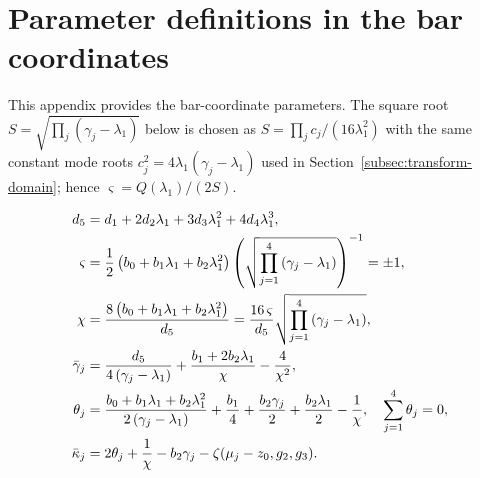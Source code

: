 \documentclass[11pt,a4paper]{article}
\numberwithin{equation}{section}
\begin{document}

\section{Parameter definitions in the bar coordinates}
\label{app:bar-coords-params}

This appendix provides the bar-coordinate parameters.
The square root $S=\sqrt{\prod_j(\gamma_j-\lambda_1)}$ below is chosen as $S=\prod_j c_j/(16\lambda_1^2)$ with the same constant mode roots $c_j^2=4\lambda_1(\gamma_j-\lambda_1)$ used in Section~\ref{subsec:transform-domain}; hence $\varsigma=Q(\lambda_1)/(2S)$.

\begin{align}
{d}_{5} &= {d}_{1} + 2 {d}_{2} {\lambda}_{1} + 3 {d}_{3} {\lambda}_{1}^{2} + 4 {d}_{4} {\lambda}_{1}^{3}, \notag  \\
\varsigma & = \frac{1}{2} \left(b_0 + b_1 {\lambda}_{1} + b_2{\lambda}_{1}^2\right) \left(\sqrt{\prod\limits_{j=1}^4 \left(\gamma_j - \lambda_1\right)}\right)^{-1}  = \pm 1, \\
\chi &= \frac{8\left(b_0 + b_1 {\lambda}_{1} + b_2{\lambda}_{1}^2\right)}{d_5} = \frac{16\, \varsigma}{d_5}\sqrt{\prod\limits_{j=1}^4 \left(\gamma_j - \lambda_1\right)}, \notag \\
\bar{\gamma}_{j} &= \frac{{d}_{5}}{4 \left({\gamma}_{j} - {\lambda}_{1}\right)} + \frac{{b}_{1} + 2 {b}_{2} {\lambda}_{1}}{\chi} - \frac{4}{\chi^{2}}, \notag \\
{\theta}_{j} &= \frac{b_0 + b_1 {\lambda}_{1} + b_2{\lambda}_{1}^2}{2\left({\gamma}_{j} - {\lambda}_{1}\right)} + \frac{{b}_{1}}{4} + \frac{{b}_{2} {\gamma}_{j}}{2} + \frac{{b}_{2} {\lambda}_{1}}{2} - \frac{1}{\chi}, \quad \sum\limits_{j=1}^{4} \theta_j = 0, \notag \\
\bar{\kappa}_j &= 2 {\theta}_{j} + \frac{1}{\chi} - {b}_{2} {\gamma}_{j} - \zeta{\left({\mu}_{j} - z_{0}, g_2, g_3\right)}.
\end{align}

\end{document}
